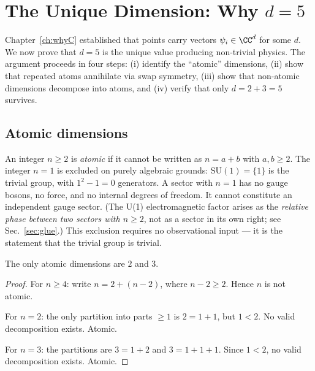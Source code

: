 \section{The Unique Dimension: Why $d = 5$}
\label{ch:whyd5}

Chapter~\ref{ch:whyC} established that points carry vectors $\psi_i \in \CC^d$ for some $d$. We now prove that $d = 5$ is the unique value producing non-trivial physics. The argument proceeds in four steps: (i) identify the ``atomic'' dimensions, (ii) show that repeated atoms annihilate via swap symmetry, (iii) show that non-atomic dimensions decompose into atoms, and (iv) verify that only $d = 2 + 3 = 5$ survives.

\subsection{Atomic dimensions}

\begin{definition}
An integer $n \geq 2$ is \emph{atomic} if it cannot be written as $n = a + b$ with $a, b \geq 2$. The integer $n = 1$ is excluded on purely algebraic grounds: $\text{SU}(1) = \{1\}$ is the trivial group, with $1^2 - 1 = 0$ generators. A sector with $n = 1$ has no gauge bosons, no force, and no internal degrees of freedom. It cannot constitute an independent gauge sector. (The U(1) electromagnetic factor arises as the \emph{relative phase between two sectors with $n \geq 2$}, not as a sector in its own right; see Sec.~\ref{sec:glue}.) This exclusion requires no observational input --- it is the statement that the trivial group is trivial.
\end{definition}

\begin{lemma}
\label{lem:atoms}
The only atomic dimensions are $2$ and $3$.
\end{lemma}

\begin{proof}
For $n \geq 4$: write $n = 2 + (n - 2)$, where $n - 2 \geq 2$. Hence $n$ is not atomic.

For $n = 2$: the only partition into parts $\geq 1$ is $2 = 1 + 1$, but $1 < 2$. No valid decomposition exists. Atomic.

For $n = 3$: the partitions are $3 = 1 + 2$ and $3 = 1 + 1 + 1$. Since $1 < 2$, no valid decomposition exists. Atomic.
\end{proof}

